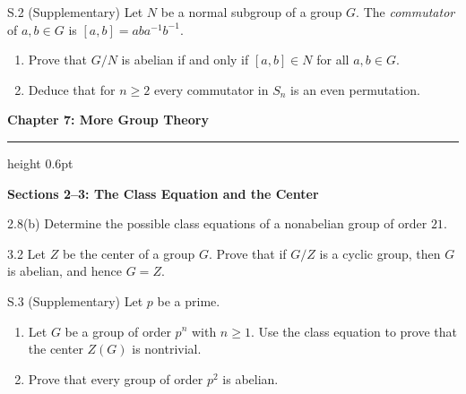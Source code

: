 \documentclass[11pt]{article}
\newcommand{\chapterheading}[1]{%
  \par\Needspace{12\baselineskip}\vspace{0.5em}
  {\color{courseblue}\Large\bfseries #1}\par\vspace{0.35em}
  {\color{boxborder}\hrule height 0.6pt}\vspace{0.35em}
}
\newcommand{\sectionheading}[1]{%
  \Needspace{8\baselineskip}
  \vspace{0.25em}
  {\color{darkgray}\large\bfseries #1}\par
}
\begin{document}
\begin{exercise}{S.2 (Supplementary)}
Let $N$ be a normal subgroup of a group $G$. The \emph{commutator} of
$a,b\in G$ is $[a,b]=aba^{-1}b^{-1}$.
\begin{enumerate}[label=\textbf{(\alph*)}]
  \item Prove that $G/N$ is abelian if and only if $[a,b]\in N$ for all
        $a,b\in G$.
  \item Deduce that for $n\geq 2$ every commutator in $S_n$ is an even permutation.
\end{enumerate}
\end{exercise}

\chapterheading{Chapter 7: More Group Theory}

\sectionheading{Sections 2--3: The Class Equation and the Center}

\begin{exercise}{2.8(b)}
Determine the possible class equations of a nonabelian group of order $21$.
\end{exercise}

\begin{exercise}{3.2}
Let $Z$ be the center of a group $G$. Prove that if $G/Z$ is a cyclic
group, then $G$ is abelian, and hence $G=Z$.
\end{exercise}

\begin{exercise}{S.3 (Supplementary)}
Let $p$ be a prime.
\begin{enumerate}[label=\textbf{(\alph*)}]
  \item Let $G$ be a group of order $p^n$ with $n\geq1$. Use the class
        equation to prove that the center $Z(G)$ is nontrivial.
  \item Prove that every group of order $p^2$ is abelian.
\end{enumerate}
\end{exercise}
\end{document}
